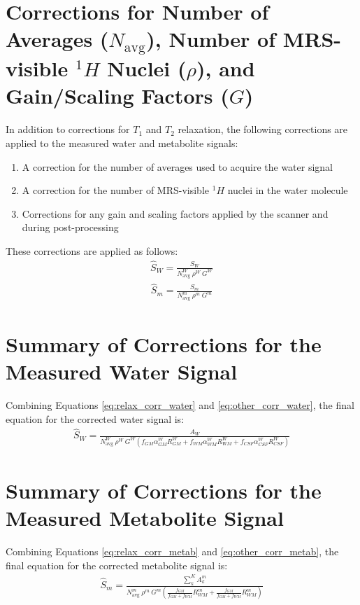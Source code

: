 \documentclass{article}
\begin{document}
\section{Corrections for Number of Averages ($N_\text{avg}$), Number of MRS-visible $^1H$ Nuclei ($\rho$), and Gain/Scaling Factors ($G$)}
In addition to corrections for $T_1$ and $T_2$ relaxation, the following corrections are applied to the measured water and metabolite signals:
\begin{enumerate}
	\item A correction for the number of averages used to acquire the water signal
	\item A correction for the number of MRS-visible $^1H$ nuclei in the water molecule
	\item Corrections for any gain and scaling factors applied by the scanner and during post-processing
\end{enumerate}

These corrections are applied as follows:
\begin{align}
	\boxed{\hat{S}_W = \frac{S_W}{N_\text{avg}^{W} ~ \rho^W ~ G^W}}
	\label{eq:other_corr_water}
\end{align}
\begin{align}
	\boxed{\hat{S}_m = \frac{S_m}{N_\text{avg}^{m} ~ \rho^m ~ G^m}}
	\label{eq:other_corr_metab}
\end{align}

\section{Summary of Corrections for the Measured Water Signal}
Combining Equations \eqref{eq:relax_corr_water} and \eqref{eq:other_corr_water}, the final equation for the corrected water signal is:
\begin{align}
	\boxed{\hat{S}_W = \frac{A_W}{N_\text{avg}^W ~ \rho^W ~ G^W \left(f_{GM} \alpha_{GM}^{W} R_{GM}^{W} + f_{WM} \alpha_{WM}^{W} R_{WM}^{W} + f_{CSF} \alpha_{CSF}^{W}  R_{CSF}^{W}\right)}}
	\label{eq:water_corrected}
\end{align}

\section{Summary of Corrections for the Measured Metabolite Signal}
Combining Equations \eqref{eq:relax_corr_metab} and \eqref{eq:other_corr_metab}, the final equation for the corrected metabolite signal is:
\begin{align}
	\boxed{\hat{S}_m = \frac{\sum_k^K A_k^m}{N_\text{avg}^{m} ~ \rho^m ~ G^m \left(\frac{f_{GM}}{f_{GM}+f_{WM}} R_{WM}^{m} + \frac{f_{GM}}{f_{GM}+f_{WM}}  R_{WM}^{m}\right)}}
	\label{eq:metab_corrected}
\end{align}
\end{document}
